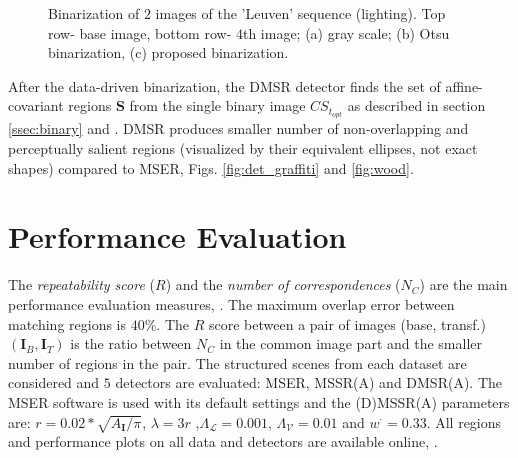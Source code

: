 \documentclass{article}
\def\I{{\mathbf I}}
\def\mcL{{\mathcal{L}}}
\def\mcV{{\mathcal{V}}}
\def\S{{\mathbf S}}
\begin{document}
\begin{figure}[htb]
 \vspace{-0.5cm}
\caption{Binarization of $2$ images of the 'Leuven' sequence (lighting). Top row- base image, bottom row- $4$th image; (a) gray scale; (b) Otsu binarization, (c) proposed binarization.}
\label{fig:leuven_bin}
%
\end{figure}

After the data-driven binarization, the DMSR detector finds the set of affine-covariant regions $\S$ from the single binary image $CS_{t_{opt}}$ as described in section \ref{ssec:binary} and \cite{RangMSSR06, RangHumpb06}. DMSR produces smaller number of non-overlapping and perceptually salient regions (visualized by their equivalent ellipses, not exact shapes) compared to MSER, Figs. \ref{fig:det_graffiti} and \ref{fig:wood}.

\section{Performance  Evaluation}
\label{sec:perf}
The {\em repeatability score} ($R$) and the {\em number of correspondences} ($N_C$) are the main performance evaluation measures, \cite{Mikolajczyk:2005}. The maximum overlap error between matching regions is $40\%$. The $R$ score between a pair of images (base, transf.) $(\I_B,\I_T)$ is the ratio between $N_C$ in the common image part and the smaller number of regions in the pair. The structured scenes from each dataset are considered and $5$ detectors are evaluated: MSER, MSSR(A) and DMSR(A). The MSER software is used with its default settings and the (D)MSSR(A) parameters are: $r = 0.02*\sqrt{A_{\I} / \pi}$, $\lambda=3r$ ,$\Lambda_{\mcL}=0.001$, $\Lambda_{\mcV}=0.01$ and  $w^{\cdot}=0.33$.  
All regions and performance plots on all data and detectors are available online, \cite{Rang:html_res}.
\end{document}
